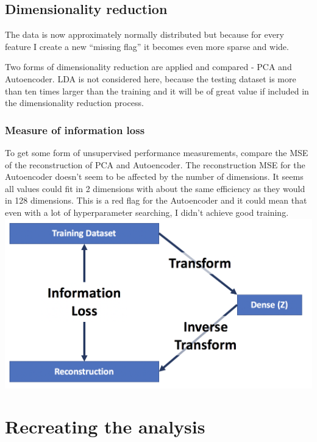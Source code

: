 \documentclass[11pt]{article}
\makeatletter
\def\maxwidth{\ifdim\Gin@nat@width>\linewidth\linewidth
    \else\Gin@nat@width\fi}
\let\Oldincludegraphics\includegraphics
\renewcommand{\includegraphics}[1]{\Oldincludegraphics[width=.8\maxwidth]{#1}}
\makeatother
\begin{document}
    \hypertarget{dimensionality-reduction}{%
\subsection{Dimensionality reduction}\label{dimensionality-reduction}}

The data is now approximately normally distributed but because for every
feature I create a new ``missing flag'' it becomes even more sparse and
wide.

Two forms of dimensionality reduction are applied and compared - PCA and
Autoencoder. LDA is not considered here, because the testing dataset is
more than ten times larger than the training and it will be of great
value if included in the dimensionality reduction process.

    \hypertarget{measure-of-information-loss}{%
\subsubsection{Measure of information
loss}\label{measure-of-information-loss}}

To get some form of unsupervised performance measurements, compare the
MSE of the reconstruction of PCA and Autoencoder. The reconstruction MSE
for the Autoencoder doesn't seem to be affected by the number of
dimensions. It seems all values could fit in 2 dimensions with about the
same efficiency as they would in 128 dimensions. This is a red flag for
the Autoencoder and it could mean that even with a lot of hyperparameter
searching, I didn't achieve good training.
\includegraphics{images/1.png}

    \hypertarget{recreating-the-analysis}{%
\section{Recreating the analysis}\label{recreating-the-analysis}}
\end{document}
